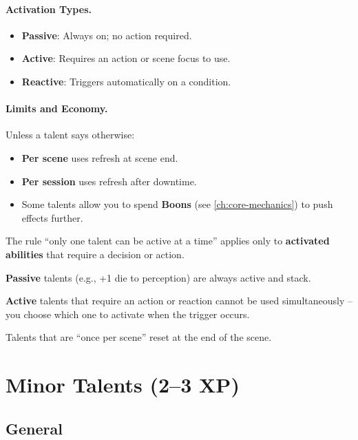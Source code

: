 \paragraph{Activation Types.}
\label{sec:talent-activation}
\begin{itemize}
\item \textbf{Passive}: Always on; no action required.
\item \textbf{Active}: Requires an action or scene focus to use.
\item \textbf{Reactive}: Triggers automatically on a condition.
\end{itemize}

\paragraph{Limits and Economy.}
\label{sec:talent-limits}
Unless a talent says otherwise:
\begin{itemize}
\item \textbf{Per scene} uses refresh at scene end.
\item \textbf{Per session} uses refresh after downtime.
\item Some talents allow you to spend \textbf{Boons} (see \ref{ch:core-mechanics}) to push effects further.
\end{itemize}

\begin{tcolorbox}[colback=yellow!5!white,colframe=yellow!75!black,title=\textbf{Only One Active Talent?},breakable]
The rule ``only one talent can be active at a time'' applies only to \textbf{activated abilities} that require a decision or action.  

\textbf{Passive} talents (e.g., +1 die to perception) are always active and stack.  

\textbf{Active} talents that require an action or reaction cannot be used simultaneously -- you choose which one to activate when the trigger occurs.  

Talents that are ``once per scene'' reset at the end of the scene.
\end{tcolorbox}

\section{Minor Talents (2--3 XP)}
\label{sec:minor-talents}

\subsection*{General}
\label{sec:minor-general}

